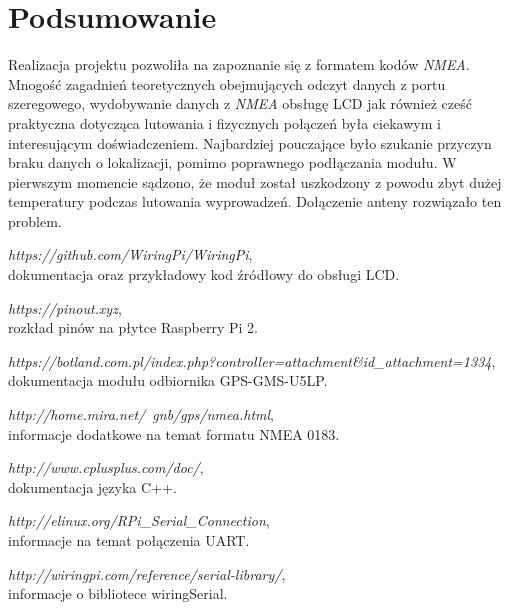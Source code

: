 \documentclass{article}
\begin{document}
\section{Podsumowanie}
	Realizacja projektu pozwoliła na zapoznanie się z formatem kodów \textit{NMEA}. Mnogość zagadnień teoretycznych obejmujących odczyt danych z portu szeregowego, wydobywanie danych z \textit{NMEA} obsługę LCD jak również cześć praktyczna dotycząca lutowania i fizycznych połączeń była ciekawym i interesującym doświadczeniem. Najbardziej pouczające było szukanie przyczyn braku danych o lokalizacji, pomimo poprawnego podłączania modułu. W pierwszym momencie sądzono, że moduł został uszkodzony z powodu zbyt dużej temperatury podczas lutowania wyprowadzeń. Dołączenie anteny rozwiązało ten problem.

	\begin{thebibliography}{999}
		{\em https://github.com/WiringPi/WiringPi}, \\
		dokumentacja oraz przykładowy kod źródłowy do obsługi LCD.
		
		{\em https://pinout.xyz}, \\
		rozkład pinów na płytce Raspberry Pi 2.
		
				{\em https://botland.com.pl/index.php?controller=attachment\&id\_attachment=1334}, \\
				dokumentacja modułu odbiornika GPS-GMS-U5LP.
				
		{\em http://home.mira.net/~gnb/gps/nmea.html}, \\
		informacje dodatkowe na temat formatu NMEA 0183.
		
				{\em http://www.cplusplus.com/doc/}, \\
				dokumentacja języka C++.
		
						{\em http://elinux.org/RPi\_Serial\_Connection}, \\
						informacje na temat połączenia UART.
		
		{\em 	http://wiringpi.com/reference/serial-library/}, \\
		informacje o bibliotece wiringSerial.

		
		
		
	\end{thebibliography}	
\end{document}
